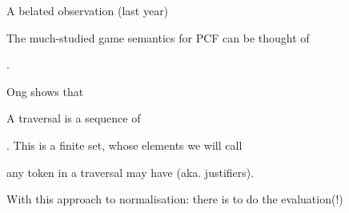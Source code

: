 \documentclass[12pt,fleqn,landscape]{article}
\begin{document}

\begin{slide}{A  belated  observation (last year)}

The much-studied game semantics for PCF can be thought of 

.


\bc
Ong \cite{ong2015} shows that
\ec



\bq
{}
\vair\vair

A traversal is a sequence of 
\vair
\bi
\item {}. This is a finite set, whose elements we will call 

\hfill {}
\vair

\item any token in a traversal may have  (aka. justifiers).
\ei
\eq

\vair\vair


With this approach to normalisation: there is  to do the evaluation(!)
\vair\vair

\hfill{}
\end{slide}
\end{document}
